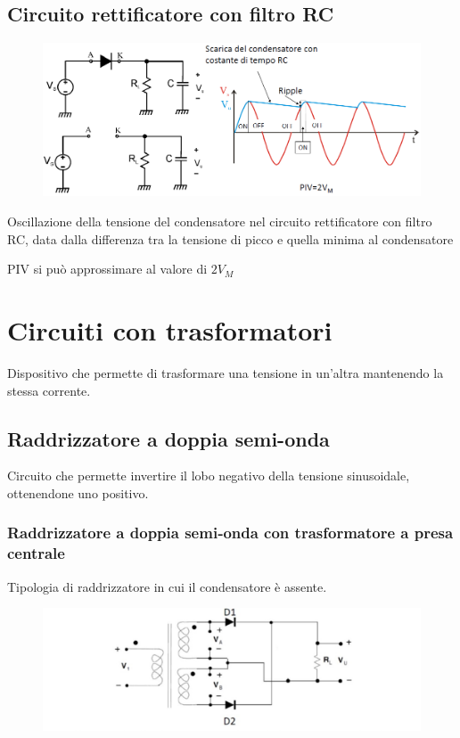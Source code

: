 \documentclass[11pt,a4paper,]{article}
\begin{document}
\subsection{Circuito rettificatore con filtro RC}
\begin{figure}[H]
    \centering
    \includegraphics[width=0.5\linewidth]{img/Circuito rettificatore con filtro RC.png}
\end{figure}
\begin{definizione}
    [Ripple]
    Oscillazione della tensione del condensatore nel circuito rettificatore con filtro RC, data dalla differenza tra la tensione di picco e quella minima al condensatore
    \begin{nota}
        PIV si può approssimare al valore di $2V_M$
    \end{nota}
\end{definizione}

\section{Circuiti con trasformatori}
\begin{definizione}
    [Trasformatore]
    Dispositivo che permette di trasformare una tensione in un'altra mantenendo la stessa corrente.
\end{definizione}
\subsection{Raddrizzatore a doppia semi-onda}
\begin{definizione}
    Circuito che permette invertire il lobo negativo della tensione sinusoidale, ottenendone uno positivo.
\end{definizione}
\subsubsection{Raddrizzatore a doppia semi‑onda con trasformatore a presa centrale}
\begin{definizione}
    Tipologia di raddrizzatore in cui il condensatore è assente.
    \begin{figure}[H]
        \centering
        \includegraphics[width=0.75\linewidth]{img/raddr presa centra.png}
    \end{figure}
\end{definizione}
\end{document}
